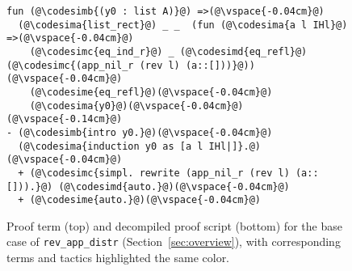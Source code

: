 \begin{figure}
\begin{lstlisting}
fun (@\codesimb{(y0 : list A)}@) =>(@\vspace{-0.04cm}@)
  (@\codesima{list_rect}@) _ _  (fun (@\codesima{a l IHl}@) =>(@\vspace{-0.04cm}@)
    (@\codesimc{eq_ind_r}@) _ (@\codesimd{eq_refl}@) (@\codesimc{(app_nil_r (rev l) (a::[]))}@))(@\vspace{-0.04cm}@)
    (@\codesime{eq_refl}@)(@\vspace{-0.04cm}@)
    (@\codesima{y0}@)(@\vspace{-0.04cm}@)
(@\vspace{-0.14cm}@)
- (@\codesimb{intro y0.}@)(@\vspace{-0.04cm}@)
  (@\codesima{induction y0 as [a l IHl|]}.@)(@\vspace{-0.04cm}@)
  + (@\codesimc{simpl. rewrite (app_nil_r (rev l) (a::[])).}@) (@\codesimd{auto.}@)(@\vspace{-0.04cm}@)
  + (@\codesime{auto.}@)(@\vspace{-0.04cm}@)
\end{lstlisting}
\vspace{-0.4cm}
\caption{Proof term (top) and decompiled proof script (bottom) for the base case of 
\lstinline{rev_app_distr} (Section~\ref{sec:overview}), with corresponding terms and tactics 
highlighted the same color.}
\label{fig:rainbow}
\end{figure}

